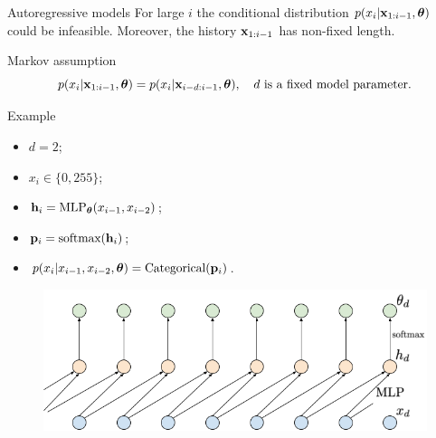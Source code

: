 \begin{frame}{Autoregressive models}
		For large $i$ the conditional distribution $p(x_i | \mathbf{x}_{1:i - 1}, \boldsymbol{\theta})$ could be infeasible. Moreover, the history $\mathbf{x}_{1:i-1}$ has non-fixed length.
		\begin{block}{Markov assumption}
			\vspace{-0.5cm}
			\[
				p(x_i | \mathbf{x}_{1:i - 1}, \boldsymbol{\theta}) = p(x_i | \mathbf{x}_{i - d:i - 1}, \boldsymbol{\theta}), \quad d \text{ is a fixed model parameter}.
			\]
		\end{block}
		\begin{block}{Example}
			\begin{minipage}[t]{0.39\columnwidth}
				{\small
				\begin{itemize}
					\item $d = 2$;
					\item $x_i \in \{0, 255\}$;
					\item $\mathbf{h}_i = \text{MLP}_{\boldsymbol{\theta}}(x_{i - 1}, x_{i - 2})$;
					\item $\mathbf{p}_i = \text{softmax}(\mathbf{h}_i)$;
					\item $p(x_i | x_{i - 1}, x_{i - 2}, \boldsymbol{\theta}) = \text{Categorical}(\mathbf{p}_i)$.
				\end{itemize}
				}
			\end{minipage}%
			\begin{minipage}[t]{0.61\columnwidth}
			    \begin{figure}
			        \centering
			        \includegraphics[width=1.0\linewidth]{figs/sequential_MLP}
			    \end{figure}
			\end{minipage}
		\end{block}
\end{frame}
